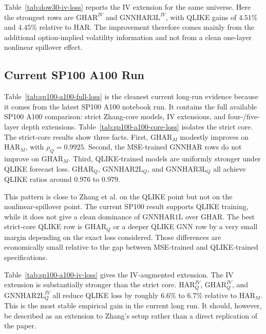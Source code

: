 \documentclass[11pt]{article}
\begin{document}




Table~\ref{tab:dow30-iv-loss} reports the IV extension for the same universe.
Here the strongest rows are \(\mathrm{GHAR}^{IV}\) and \(\mathrm{GNNHAR3L}^{IV}\), with QLIKE gains of \(4.51\%\) and \(4.45\%\) relative to HAR.
The improvement therefore comes mainly from the additional option-implied volatility information and not from a clean one-layer nonlinear spillover effect.



\subsection{Current SP100 A100 Run}

Table~\ref{tab:sp100-a100-full-loss} is the cleanest current long-run evidence because it comes from the latest SP100 A100 notebook run.
It contains the full available SP100 A100 comparison: strict Zhang-core models, IV extensions, and four-/five-layer depth extensions.
Table~\ref{tab:sp100-a100-core-loss} isolates the strict core.
The strict-core results show three facts.
First, \(\mathrm{GHAR}_M\) modestly improves on \(\mathrm{HAR}_M\), with \(\rho_Q=0.9925\).
Second, the MSE-trained GNNHAR rows do not improve on \(\mathrm{GHAR}_M\).
Third, QLIKE-trained models are uniformly stronger under QLIKE forecast loss.
\(\mathrm{GHAR}_Q\), \(\mathrm{GNNHAR2L}_Q\), and \(\mathrm{GNNHAR3L}_Q\) all achieve QLIKE ratios around \(0.976\) to \(0.979\).





This pattern is close to Zhang et al. on the QLIKE point but not on the nonlinear-spillover point.
The current SP100 result supports QLIKE training, while it does not give a clean dominance of \(\mathrm{GNNHAR1L}\) over \(\mathrm{GHAR}\).
The best strict-core QLIKE row is \(\mathrm{GHAR}_Q\) or a deeper QLIKE GNN row by a very small margin depending on the exact loss considered.
Those differences are economically small relative to the gap between MSE-trained and QLIKE-trained specifications.

Table~\ref{tab:sp100-a100-iv-loss} gives the IV-augmented extension.
The IV extension is substantially stronger than the strict core.
\(\mathrm{HAR}^{IV}_Q\), \(\mathrm{GHAR}^{IV}_Q\), and \(\mathrm{GNNHAR2L}^{IV}_Q\) all reduce QLIKE loss by roughly \(6.6\%\) to \(6.7\%\) relative to \(\mathrm{HAR}_M\).
This is the most stable empirical gain in the current long run.
It should, however, be described as an extension to Zhang's setup rather than a direct replication of the paper.
\end{document}
